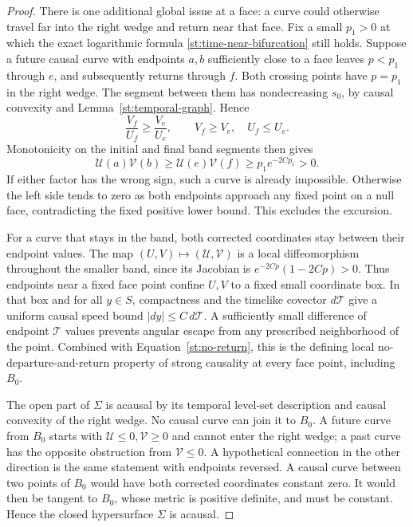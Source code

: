 \begin{proof}
There is one additional global issue at a face: a curve could
otherwise travel far into the right wedge and return near that
face.  Fix a small $p_1>0$ at which the exact logarithmic formula
\eqref{st:time-near-bifurcation} still holds.  Suppose a future
causal curve with endpoints $a,b$ sufficiently close to a face
leaves $p<p_1$ through $e$, and subsequently returns through $f$.
Both crossing points have $p=p_1$ in the right wedge.  The segment
between them has nondecreasing $s_0$, by causal convexity and
Lemma~\ref{st:temporal-graph}.  Hence
\[
 \frac{V_f}{U_f}\geq\frac{V_e}{U_e},\qquad
 V_f\geq V_e,\quad U_f\leq U_e.
\]
Monotonicity on the initial and final band segments then gives
\begin{equation}\label{st:no-return}
 \mathcal U(a)\mathcal V(b)
 \geq \mathcal U(e)\mathcal V(f)
 \geq p_1 e^{-2Cp_1}>0.
\end{equation}
If either factor has the wrong sign, such a curve is already
impossible.  Otherwise the left side tends to zero as both endpoints
approach any fixed point on a null face, contradicting the fixed
positive lower bound.  This excludes the excursion.

For a curve that stays in the band, both corrected coordinates stay
between their endpoint values.  The map
$(U,V)\mapsto(\mathcal U,\mathcal V)$ is a local diffeomorphism
throughout the smaller band, since its Jacobian is
$e^{-2Cp}(1-2Cp)>0$.  Thus endpoints near a fixed face point confine
$U,V$ to a fixed small coordinate box.  In that box and for all
$y\in S$, compactness and the timelike covector $d\mathcal T$
give a uniform causal speed bound
$|dy|\leq C\,d\mathcal T$.  A sufficiently small difference of
endpoint $\mathcal T$ values prevents angular escape from any
prescribed neighborhood of the point.  Combined with
Equation~\eqref{st:no-return}, this is the defining local
no-departure-and-return property of strong causality at every face
point, including $B_0$.

The open part of $\Sigma$ is acausal by its temporal level-set
description and causal convexity of the right wedge.  No causal
curve can join it to $B_0$.  A future curve from $B_0$ starts with
$\mathcal U\leq0,\mathcal V\geq0$ and cannot enter the right
wedge; a past curve has the opposite obstruction from
$\mathcal V\leq0$.  A hypothetical connection in the other
direction is the same statement with endpoints reversed.  A causal
curve between two points of $B_0$ would have both corrected
coordinates constant zero.  It would then be tangent to $B_0$,
whose metric is positive definite, and must be constant.  Hence
the closed hypersurface $\Sigma$ is acausal.


\end{proof}
